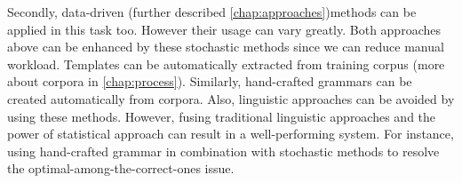 Secondly, data-driven (further described \autoref{chap:approaches})methods can be applied in this task too. However their usage can vary greatly. Both approaches above can be enhanced by these stochastic methods since we can reduce manual workload. Templates can be automatically extracted from training corpus (more about corpora in \autoref{chap:process}). Similarly, hand-crafted grammars can be created automatically from corpora. Also, linguistic approaches can be avoided by using these methods. However, fusing traditional linguistic approaches and the power of statistical approach can result in a well-performing system. For instance, using hand-crafted grammar in combination with stochastic methods to resolve the optimal-among-the-correct-ones issue.



